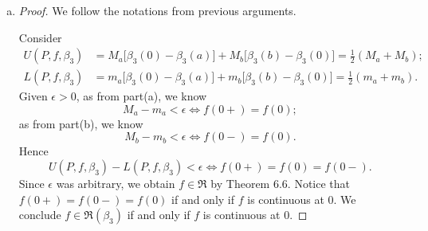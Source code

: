\begin{Exercise}
\begin{enumerate}[(a)]
		\begin{itemize}
			\item $\int f\,d\beta_2 = f(0)$ under the hypothesis.
		\end{itemize}
		\begin{proof}
			By definition, we know
			$$
			L(P,f,\beta_2) \leq \int f\,d\beta_2 \leq U(P,f,\beta_2).
			$$
			We follow the notations from previous arguments.
			Thus we have
			\begin{align*}
			U(P,f,\beta_2) &= M_a \geq f(0); \\
			L(P,f,\beta_2) &= m_a \leq f(0).
			\end{align*}
			Given $\epsilon > 0$, it follows that
			\begin{align*}
			f(0)-\int f\,d\beta_2 \leq U(P,f,\beta_2) - L(P,f,\beta_2) < \epsilon; \\
			\int f\,d\beta_2-f(0) \leq U(P,f,\beta_2) - L(P,f,\beta_2) < \epsilon.
			\end{align*}
			Hence
			$$
			\left| \int f\,d\beta_2-f(0) \right| < \epsilon.
			$$
			Since $\epsilon$ was arbitrary, we conclude
			$$
			\int f\,d\beta_2 = f(0)
			$$
			as desired.
		\end{proof}
		
		\item
		\begin{proof}
			We follow the notations from previous arguments.
			
			Consider
			\begin{align*}
			U(P,f,\beta_3)
			&= M_a \big[ \beta_3(0) - \beta_3(a) \big] + M_b \big[ \beta_3(b) - \beta_3(0) \big]
			= \frac{1}{2}(M_a + M_b); \\
			L(P,f,\beta_3)
			&= m_a \big[ \beta_3(0) - \beta_3(a) \big] + m_b \big[ \beta_3(b) - \beta_3(0) \big]
			= \frac{1}{2}(m_a + m_b).
			\end{align*}
			Given $\epsilon > 0$, as from part(a), we know
			\begin{equation}
			M_a - m_a < \epsilon \iff f(0+) = f(0);\label{eq:ex_6.3c1}
			\end{equation}
			as from part(b), we know
			\begin{equation}
			M_b - m_b < \epsilon \iff f(0-) = f(0).\label{eq:ex_6.3c2}
			\end{equation}
			Hence
			$$
			U(P,f,\beta_3) - L(P,f,\beta_3) < \epsilon \iff f(0+) = f(0) = f(0-).
			$$
			Since $\epsilon$ was arbitrary, we obtain $f\in\mathfrak{R}$ by Theorem 6.6.
			Notice that $f(0+) = f(0-) = f(0)$ if and only if $f$ is continuous at $0$.
			We conclude $f\in\mathfrak{R}(\beta_3)$ if and only if $f$ is continuous at $0$.
		\end{proof}
		

\end{enumerate}
\end{Exercise}
